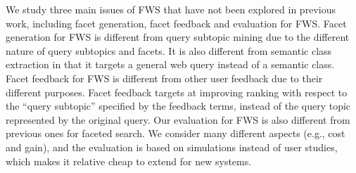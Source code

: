 We study three main issues of FWS that have not been explored in previous work, including facet generation, facet feedback and evaluation for FWS. Facet generation for FWS is different from query subtopic mining due to the different nature of query subtopics and facets. It is also different from semantic class extraction in that it targets a general web query instead of a semantic class. Facet feedback for FWS is different from other user feedback due to their different purposes. Facet feedback targets at improving ranking with respect to the ``query subtopic'' specified by the feedback terms, instead of the query topic represented by the original query. Our evaluation for FWS is also different from previous ones for faceted search. We consider many different aspects (e.g., cost and gain), and the evaluation is based on simulations instead of user studies, which makes it relative cheap to extend for new systems.
